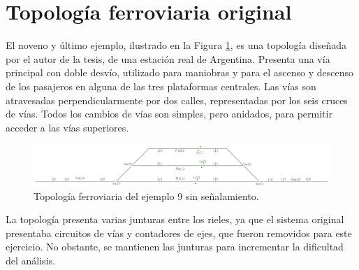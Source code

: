 \section{Topología ferroviaria original}

	El noveno y último ejemplo, ilustrado en la Figura \ref{fig:EJ9_1}, es una topología diseñada por el autor de la tesis, de una estación real de Argentina. Presenta una vía principal con doble desvío, utilizado para maniobras y para el ascenso y descenso de los pasajeros en alguna de las tres plataformas centrales. Las vías son atravesadas perpendicularmente por dos calles, representadas por los seis cruces de vías. Todos los cambios de vías son simples, pero anidados, para permitir acceder a las vías superiores.	
	
	\begin{figure}[h]
		\centering
		\includegraphics[width=1\textwidth]{resultados-obtenidos/ejemplo9/images/9_empty.png}
		\centering\caption{Topología ferroviaria del ejemplo 9 sin señalamiento.}
		\label{fig:EJ9_1}
	\end{figure}
	
	La topología presenta varias junturas entre los rieles, ya que el sistema original presentaba circuitos de vías y contadores de ejes, que fueron removidos para este ejercicio. No obstante, se mantienen las junturas para incrementar la dificultad del análisis.